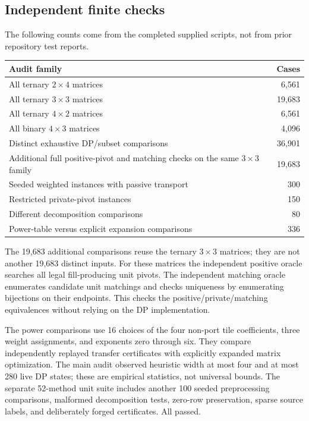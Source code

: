 \documentclass[11pt,a4paper]{article}
\theoremstyle{definition}
\theoremstyle{remark}
\begin{document}
\subsection{Independent finite checks}
The following counts come from the completed supplied scripts, not from
prior repository test reports.
\begin{center}\small
\begin{tabular}{lr}
\toprule
Audit family & Cases \\
\midrule
All ternary $2\times4$ matrices & 6,561\\
All ternary $3\times3$ matrices & 19,683\\
All ternary $4\times2$ matrices & 6,561\\
All binary $4\times3$ matrices & 4,096\\
\midrule
Distinct exhaustive DP/subset comparisons & 36,901\\
Additional full positive-pivot and matching checks on the same $3\times3$ family & 19,683\\
Seeded weighted instances with passive transport & 300\\
Restricted private-pivot instances & 150\\
Different decomposition comparisons & 80\\
Power-table versus explicit expansion comparisons & 336\\
\bottomrule
\end{tabular}
\end{center}

The 19,683 additional comparisons reuse the ternary $3\times3$ matrices;
they are not another 19,683 distinct inputs. For these matrices the
independent positive oracle searches all legal fill-producing unit pivots.
The independent matching oracle enumerates candidate unit matchings and
checks uniqueness by enumerating bijections on their endpoints. This
checks the positive/private/matching equivalences without relying on the
DP implementation.

The power comparisons use 16 choices of the four non-port tile coefficients,
three weight assignments, and exponents zero through six. They compare
independently replayed transfer certificates with explicitly expanded
matrix optimization. The main audit observed heuristic width at most four
and at most 280 live DP states; these are empirical statistics, not
universal bounds. The separate 52-method unit suite includes another 100
seeded preprocessing comparisons, malformed decomposition tests, zero-row
preservation, sparse source labels, and deliberately forged certificates.
All passed.
\end{document}
